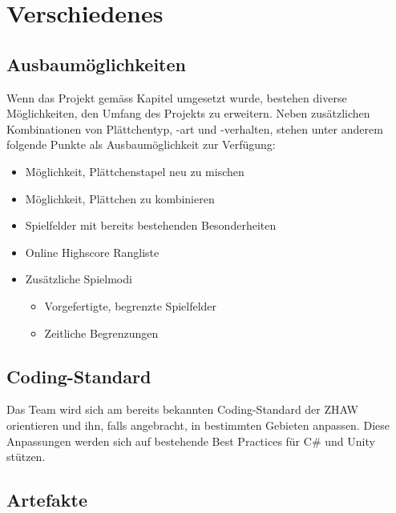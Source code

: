 \documentclass[../main.tex]{subfiles}
\begin{document}
	\section{Verschiedenes}
	
	\subsection{Ausbaumöglichkeiten}
	\par Wenn das Projekt gemäss Kapitel  umgesetzt wurde, bestehen diverse Möglichkeiten, den Umfang des Projekts zu erweitern. Neben zusätzlichen Kombinationen von Plättchentyp, -art und -verhalten, stehen unter anderem folgende Punkte als Ausbaumöglichkeit zur Verfügung:
	\begin{itemize}
		\item Möglichkeit, Plättchenstapel neu zu mischen
		\item Möglichkeit, Plättchen zu kombinieren
		\item Spielfelder mit bereits bestehenden Besonderheiten
		\item Online Highscore Rangliste 
		\item Zusätzliche Spielmodi
		\begin{itemize}
			\item Vorgefertigte, begrenzte Spielfelder
			\item Zeitliche Begrenzungen
		\end{itemize}
	\end{itemize}
	\subsection{Coding-Standard}
	\par Das Team wird sich am bereits bekannten Coding-Standard der ZHAW orientieren und ihn, falls angebracht, in bestimmten Gebieten anpassen. Diese Anpassungen werden sich auf bestehende Best Practices  für C\#  und Unity  stützen.
	\subsection{Artefakte}
\end{document}
